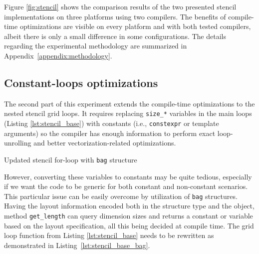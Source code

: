 Figure \ref{fig:stencil} shows the comparison results of the two presented stencil implementations on three platforms using two compilers. The benefits of compile-time optimizations are visible on every platform and with both tested compilers, albeit there is only a small difference in some configurations. The details regarding the experimental methodology are summarized in Appendix~\ref{appendix:methodology}.


\subsection{Constant-loops optimizations}

The second part of this experiment extends the compile-time optimizations to the nested stencil grid loops. It requires replacing \texttt{size\_*} variables in the main loops (Listing \ref{lst:stencil_base}) with constants (i.e., \texttt{constexpr} or template arguments) so the compiler has enough information to perform exact loop-unrolling and better vectorization-related optimizations.

\begin{listing}[h]
  \vspace{-10pt}
  \vspace{-20pt}
  \caption{Updated stencil for-loop with \texttt{bag} structure}
  \label{lst:stencil_base_bag}
\end{listing}
\vspace{-10pt}

However, converting these variables to constants may be quite tedious, especially if we want the code to be generic for both constant and non-constant scenarios. This particular issue can be easily overcome by utilization of \Noarr{} \texttt{bag} structures. Having the layout information encoded both in the structure type and the object, method \texttt{get\_length} can query dimension sizes and returns a constant or variable based on the layout specification, all this being decided at compile time. The grid loop function from Listing \ref{lst:stencil_base} needs to be rewritten as demonstrated in Listing~\ref{lst:stencil_base_bag}.

